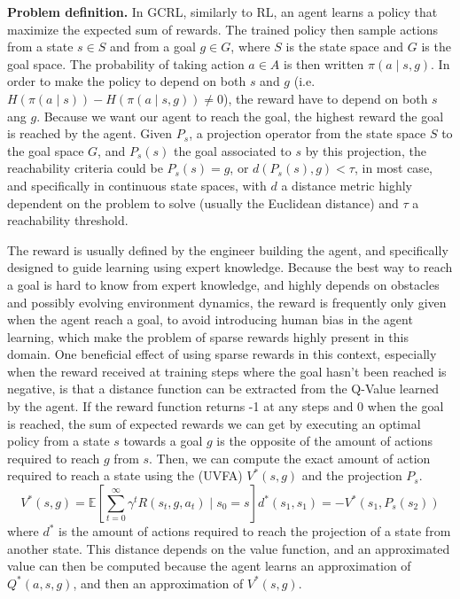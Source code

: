 \textbf{Problem definition.}
In GCRL, similarly to RL, an agent learns a policy that maximize the expected sum of rewards.
The trained policy then sample actions from a state $s \in S$ and from a goal $g \in G$, where $S$ is the state
space and $G$ is the goal space.
The probability of taking action $a \in A$ is then written $\pi(a \mid s, g)$.
In order to make the policy to depend on both $s$ and $g$ (i.e. $H(\pi(a \mid s)) - H(\pi(a \mid s, g)) \neq 0$), the
reward have to depend on both $s$ ang $g$.
Because we want our agent to reach the goal, the highest reward the goal is reached by the agent.
Given $P_s$, a projection operator from the state space $S$ to the goal space $G$, and $P_s(s)$ the goal associated to
$s$ by this projection, the reachability criteria could be $P_s(s) = g$, or $d(P_s(s), g) < \tau$, in most case, and
specifically in continuous state spaces, with $d$ a distance metric highly dependent on the problem to solve (usually
the Euclidean distance) and $\tau$ a reachability threshold.

The reward is usually defined by the engineer building the agent, and specifically designed to guide learning using
expert knowledge.
Because the best way to reach a goal is hard to know from expert knowledge, and highly depends on obstacles and possibly
evolving environment dynamics, the reward is frequently only given when the agent reach a goal, to avoid introducing
human bias in the agent learning, which make the problem of sparse rewards highly present in this domain.
One beneficial effect of using sparse rewards in this context, especially when the reward received at training steps
where the goal hasn't been reached is negative, is that a distance function can be extracted from the Q-Value learned by
the agent.
If the reward function returns -1 at any steps and 0 when the goal is reached, the sum of expected rewards we can get by
executing an optimal policy from a state $s$ towards a goal $g$ is the opposite of the amount of actions required to
reach $g$ from $s$.
Then, we can compute the exact amount of action required to reach a state using the  (UVFA) $V^*(s, g)$
and the projection $P_s$.
\begin{equation} \label{eq:bg:rl:uvfa-distance}
    V^*(s, g) = \mathbb{E} \left[ \sum_{t=0}^\infty \gamma^t R(s_t, g, a_t) \mid s_0 = s \right]
    d^*(s_1, s_1) = - V^*(s_1, P_s(s_2))
\end{equation}
where $d^*$ is the amount of actions required to reach the projection of a state from another state.
This distance depends on the value function, and an approximated value can then be computed because the agent learns an
approximation of $Q^*(a, s, g)$, and then an approximation of $V^*(s, g)$.

